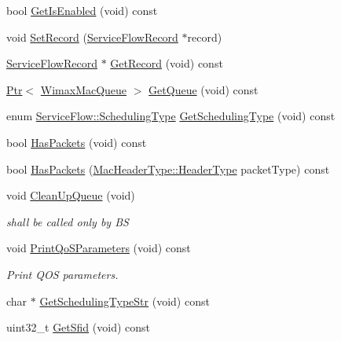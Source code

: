 \begin{DoxyCompactItemize}
\item 
bool \hyperlink{classns3_1_1ServiceFlow_a895d8579e2659c13b252890643cca936}{Get\+Is\+Enabled} (void) const 
\item 
void \hyperlink{classns3_1_1ServiceFlow_a8a6d9e7b36243db916b77c3a404a8ccd}{Set\+Record} (\hyperlink{classns3_1_1ServiceFlowRecord}{Service\+Flow\+Record} $\ast$record)
\item 
\hyperlink{classns3_1_1ServiceFlowRecord}{Service\+Flow\+Record} $\ast$ \hyperlink{classns3_1_1ServiceFlow_ab5da047b26f9aa7458745d98059f83d0}{Get\+Record} (void) const 
\item 
\hyperlink{classns3_1_1Ptr}{Ptr}$<$ \hyperlink{classns3_1_1WimaxMacQueue}{Wimax\+Mac\+Queue} $>$ \hyperlink{classns3_1_1ServiceFlow_a1d4d23e3bd3e1a58f29eb4e04a313c85}{Get\+Queue} (void) const 
\item 
enum \hyperlink{classns3_1_1ServiceFlow_a7990ba10be1e098328fd1e6382a26235}{Service\+Flow\+::\+Scheduling\+Type} \hyperlink{classns3_1_1ServiceFlow_a260766f4854f202822982aede314aeae}{Get\+Scheduling\+Type} (void) const 
\item 
bool \hyperlink{classns3_1_1ServiceFlow_a5a309b2fb06a9a0a1aeec17614959137}{Has\+Packets} (void) const 
\item 
bool \hyperlink{classns3_1_1ServiceFlow_a6c86b6512a280ba4f10846d1cfeab77e}{Has\+Packets} (\hyperlink{classns3_1_1MacHeaderType_a54d8fc8bc93a2b7865627965cdd31c20}{Mac\+Header\+Type\+::\+Header\+Type} packet\+Type) const 
\item 
void \hyperlink{classns3_1_1ServiceFlow_ab086b5cf0f3195efe3457db06d866923}{Clean\+Up\+Queue} (void)
\begin{DoxyCompactList}\small\item\em shall be called only by BS \end{DoxyCompactList}\item 
void \hyperlink{classns3_1_1ServiceFlow_ae6076806caa014d4e3d2459f8eb1ff6b}{Print\+Qo\+S\+Parameters} (void) const 
\begin{DoxyCompactList}\small\item\em Print Q\+OS parameters. \end{DoxyCompactList}\item 
char $\ast$ \hyperlink{classns3_1_1ServiceFlow_ab860b4d08cddddf6052f4fa5638d520a}{Get\+Scheduling\+Type\+Str} (void) const 
\item 
uint32\+\_\+t \hyperlink{classns3_1_1ServiceFlow_a3ceebc0cc381b944c902abf46804e9a0}{Get\+Sfid} (void) const 
\item 

\end{DoxyCompactItemize}
